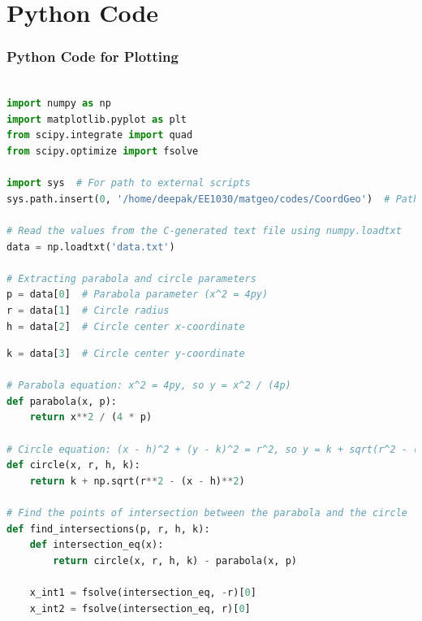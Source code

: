 \documentclass{beamer}
\theoremstyle{remark}
\numberwithin{equation}{section}
\begin{document}
\section{Python Code}
\begin{frame}[fragile]
\frametitle{Python Code for Plotting}
\begin{lstlisting}[language=Python]

import numpy as np
import matplotlib.pyplot as plt
from scipy.integrate import quad
from scipy.optimize import fsolve

import sys  # For path to external scripts
sys.path.insert(0, '/home/deepak/EE1030/matgeo/codes/CoordGeo')  # Path to my scripts

# Read the values from the C-generated text file using numpy.loadtxt
data = np.loadtxt('data.txt')

# Extracting parabola and circle parameters
p = data[0]  # Parabola parameter (x^2 = 4py)
r = data[1]  # Circle radius
h = data[2]  # Circle center x-coordinate


\end{lstlisting}
\end{frame}

\begin{frame}[fragile]
\begin{lstlisting}[language=Python]
k = data[3]  # Circle center y-coordinate

# Parabola equation: x^2 = 4py, so y = x^2 / (4p)
def parabola(x, p):
    return x**2 / (4 * p)

# Circle equation: (x - h)^2 + (y - k)^2 = r^2, so y = k + sqrt(r^2 - (x - h)^2)
def circle(x, r, h, k):
    return k + np.sqrt(r**2 - (x - h)**2)

# Find the points of intersection between the parabola and the circle
def find_intersections(p, r, h, k):
    def intersection_eq(x):
        return circle(x, r, h, k) - parabola(x, p)

    x_int1 = fsolve(intersection_eq, -r)[0]
    x_int2 = fsolve(intersection_eq, r)[0]

  
\end{lstlisting}
\end{frame}
\end{document}

